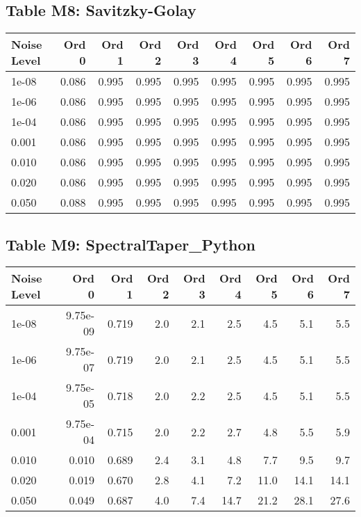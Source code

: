 \documentclass[10pt]{article}
\begin{document}
\clearpage

\subsection*{Table M8: Savitzky-Golay}

\begin{longtable}{lrrrrrrrr}
\toprule
\textbf{Noise Level} & \textbf{Ord 0} & \textbf{Ord 1} & \textbf{Ord 2} & \textbf{Ord 3} & \textbf{Ord 4} & \textbf{Ord 5} & \textbf{Ord 6} & \textbf{Ord 7} \\
\midrule
\endhead
1e-08 & 0.086 & 0.995 & 0.995 & 0.995 & 0.995 & 0.995 & 0.995 & 0.995 \\
1e-06 & 0.086 & 0.995 & 0.995 & 0.995 & 0.995 & 0.995 & 0.995 & 0.995 \\
1e-04 & 0.086 & 0.995 & 0.995 & 0.995 & 0.995 & 0.995 & 0.995 & 0.995 \\
0.001 & 0.086 & 0.995 & 0.995 & 0.995 & 0.995 & 0.995 & 0.995 & 0.995 \\
0.010 & 0.086 & 0.995 & 0.995 & 0.995 & 0.995 & 0.995 & 0.995 & 0.995 \\
0.020 & 0.086 & 0.995 & 0.995 & 0.995 & 0.995 & 0.995 & 0.995 & 0.995 \\
0.050 & 0.088 & 0.995 & 0.995 & 0.995 & 0.995 & 0.995 & 0.995 & 0.995 \\
\bottomrule
\end{longtable}

\clearpage

\subsection*{Table M9: SpectralTaper\_Python}

\begin{longtable}{lrrrrrrrr}
\toprule
\textbf{Noise Level} & \textbf{Ord 0} & \textbf{Ord 1} & \textbf{Ord 2} & \textbf{Ord 3} & \textbf{Ord 4} & \textbf{Ord 5} & \textbf{Ord 6} & \textbf{Ord 7} \\
\midrule
\endhead
1e-08 & 9.75e-09 & 0.719 & 2.0 & 2.1 & 2.5 & 4.5 & 5.1 & 5.5 \\
1e-06 & 9.75e-07 & 0.719 & 2.0 & 2.1 & 2.5 & 4.5 & 5.1 & 5.5 \\
1e-04 & 9.75e-05 & 0.718 & 2.0 & 2.2 & 2.5 & 4.5 & 5.1 & 5.5 \\
0.001 & 9.75e-04 & 0.715 & 2.0 & 2.2 & 2.7 & 4.8 & 5.5 & 5.9 \\
0.010 & 0.010 & 0.689 & 2.4 & 3.1 & 4.8 & 7.7 & 9.5 & 9.7 \\
0.020 & 0.019 & 0.670 & 2.8 & 4.1 & 7.2 & 11.0 & 14.1 & 14.1 \\
0.050 & 0.049 & 0.687 & 4.0 & 7.4 & 14.7 & 21.2 & 28.1 & 27.6 \\
\bottomrule
\end{longtable}
\end{document}
